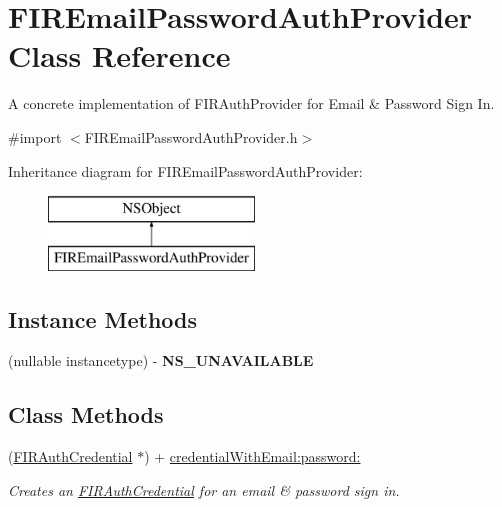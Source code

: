 \hypertarget{interface_f_i_r_email_password_auth_provider}{}\section{F\+I\+R\+Email\+Password\+Auth\+Provider Class Reference}
\label{interface_f_i_r_email_password_auth_provider}


A concrete implementation of {\ttfamily F\+I\+R\+Auth\+Provider} for Email \& Password Sign In.  




{\ttfamily \#import $<$F\+I\+R\+Email\+Password\+Auth\+Provider.\+h$>$}

Inheritance diagram for F\+I\+R\+Email\+Password\+Auth\+Provider\+:\begin{figure}[H]
\begin{center}
\leavevmode
\includegraphics[height=2.000000cm]{interface_f_i_r_email_password_auth_provider}
\end{center}
\end{figure}
\subsection*{Instance Methods}
\begin{DoxyCompactItemize}
\item 
\hypertarget{interface_f_i_r_email_password_auth_provider_ae25601bd260144ff38863c8a194614da}{}(nullable instancetype) -\/ {\bfseries N\+S\+\_\+\+U\+N\+A\+V\+A\+I\+L\+A\+B\+L\+E}\label{interface_f_i_r_email_password_auth_provider_ae25601bd260144ff38863c8a194614da}

\end{DoxyCompactItemize}
\subsection*{Class Methods}
\begin{DoxyCompactItemize}
\item 
(\hyperlink{interface_f_i_r_auth_credential}{F\+I\+R\+Auth\+Credential} $\ast$) + \hyperlink{interface_f_i_r_email_password_auth_provider_abec84e01ebc384e8803fc6510d561cc2}{credential\+With\+Email\+:password\+:}
\begin{DoxyCompactList}\small\item\em Creates an {\ttfamily \hyperlink{interface_f_i_r_auth_credential}{F\+I\+R\+Auth\+Credential}} for an email \& password sign in. \end{DoxyCompactList}\end{DoxyCompactItemize}


